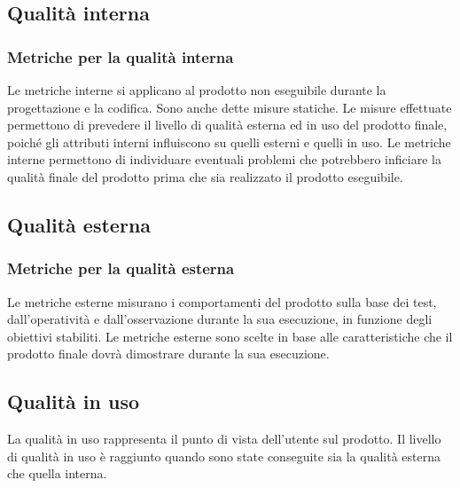 \subsection{Qualità interna} \label{subsection:qualita_interna}
\subsubsection{Metriche per la qualità interna}
Le metriche interne si applicano al prodotto non eseguibile durante la progettazione e la codifica. Sono anche dette misure statiche.
Le misure effettuate permettono di prevedere il livello di qualità esterna ed in uso del prodotto finale, poiché gli attributi interni influiscono su quelli esterni e quelli in uso.
Le metriche interne permettono di individuare eventuali problemi che potrebbero inficiare la qualità finale del prodotto prima che sia realizzato il prodotto eseguibile.



\subsection{Qualità esterna} \label{subsection:qualita_esterna}
\subsubsection{Metriche per la qualità esterna}
Le metriche esterne misurano i comportamenti del prodotto sulla base dei test, dall'operatività e dall'osservazione durante la sua esecuzione, in funzione degli obiettivi stabiliti.
Le metriche esterne sono scelte in base alle caratteristiche che il prodotto finale dovrà dimostrare durante la sua esecuzione.

\subsection{Qualità in uso} \label{subsection:qualita_uso}
La qualità in uso rappresenta il punto di vista dell'utente sul prodotto. Il livello di qualità in uso è raggiunto quando sono state conseguite sia la qualità esterna che quella interna.

